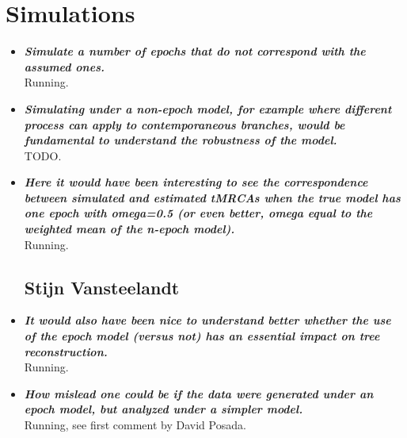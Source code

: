 \documentclass[english]{article}
\begin{document}


\setcounter{page}{1}

\bigskip
\medskip
{}
\bigskip


\section*{Simulations}

\begin{itemize}

\subsection*{David Posada}

\item {
{\it
\textbf{
Simulate a number of epochs that do not correspond with the assumed ones.
}%
}%
}%
\\
Running.

\item {
{\it
\textbf{
Simulating under a non-epoch model, for example where different process can apply to contemporaneous branches, would be fundamental to understand the robustness of the model.
}%
}%
}%
\\
TODO.



\item {
{\it
\textbf{
Here it would have been interesting to see the correspondence between simulated and estimated tMRCAs when the true model has one epoch with omega=0.5 (or even better, omega equal to the weighted mean of the n-epoch model).
}%
}%
}%
\\
Running.

\subsection*{Stijn Vansteelandt}

\item {
{\it
\textbf{
It would also have been nice to understand better whether the use of the
epoch model (versus not) has an essential impact on tree reconstruction.
}%
}%
}%
\\
Running.


\item {
{\it
\textbf{
How mislead one could be if the data were generated under an epoch model, but analyzed under a simpler model.
}%
}%
}%
\\
Running, see first comment by David Posada.


\end{itemize}
\end{document}
